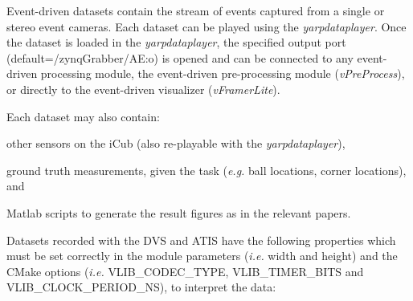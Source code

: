 Event-\/driven datasets contain the stream of events captured from a single or stereo event cameras. Each dataset can be played using the {\itshape yarpdataplayer}. Once the dataset is loaded in the {\itshape yarpdataplayer}, the specified output port (default={\ttfamily /zynq\+Grabber/\+AE\+:o}) is opened and can be connected to any event-\/driven processing module, the event-\/driven pre-\/processing module ({\itshape v\+Pre\+Process}), or directly to the event-\/driven visualizer ({\itshape v\+Framer\+Lite}).

Each dataset may also contain\+:


\begin{DoxyItemize}
\item other sensors on the i\+Cub (also re-\/playable with the {\itshape yarpdataplayer}),
\item ground truth measurements, given the task ({\itshape e.\+g.} ball locations, corner locations), and
\item Matlab scripts to generate the result figures as in the relevant papers.
\end{DoxyItemize}

Datasets recorded with the D\+VS and A\+T\+IS have the following properties which must be set correctly in the module parameters ({\itshape i.\+e.} width and height) and the C\+Make options ({\itshape i.\+e.} {\ttfamily V\+L\+I\+B\+\_\+\+C\+O\+D\+E\+C\+\_\+\+T\+Y\+PE}, {\ttfamily V\+L\+I\+B\+\_\+\+T\+I\+M\+E\+R\+\_\+\+B\+I\+TS} and {\ttfamily V\+L\+I\+B\+\_\+\+C\+L\+O\+C\+K\+\_\+\+P\+E\+R\+I\+O\+D\+\_\+\+NS}), to interpret the data\+:

